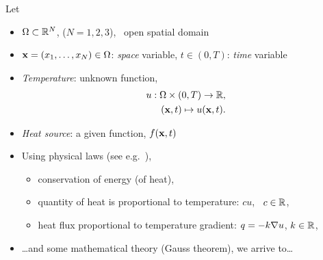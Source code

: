 \SetEmptyBackground
\begin{frame}
  Let
  \begin{itemize}
  \item $\Omega\subset{\mathbb R}^N$, \quad ($N=1,2,3$), \ open spatial domain 
  \item $\mathbf{x}=(x_1,\dots,x_N) \in \Omega$: \textit{space} variable, \quad $t\in (0,T)$: \textit{time} variable
  \item \textit{Temperature}: unknown function,
    \begin{align*}
    u:\Omega\times (0,T) \to {\mathbb R}, \\
      (\mathbf{x},t) \mapsto u(\mathbf{x},t).
    \end{align*}
    \vspace{-1em}
    \pause
  \item \textit{Heat source}: a given function, $f(\mathbf{x},t)$
    \vspace{0.66em}
  \item Using physical laws (see e.g.~\cite{allaire:2007}),
    \begin{itemize}
    \item conservation of energy (of heat),
    \item quantity of heat is proportional to temperature: $c u$, \ $c\in{\mathbb R}$,
    \item heat flux proportional to temperature gradient: $q=-k\nabla u$, $k\in{\mathbb R}$,
    \end{itemize}
  \item \dots and some mathematical theory (Gauss theorem), we arrive to\dots
  \end{itemize}
\end{frame}

